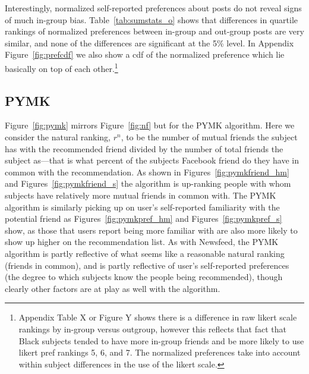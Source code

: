 \documentclass[12pt,letterpaper]{article}
\begin{document}
Interestingly, normalized self-reported preferences about posts do not reveal signs of much in-group bias. Table~\ref{tab:sumstats_o} shows that differences in quartile rankings of normalized preferences between in-group and out-group posts are very similar, and none of the differences are significant at the 5\% level. In Appendix Figure~\ref{fig:prefcdf} we also show a cdf of the normalized preference which lie basically on top of each other.\footnote{Appendix Table X or Figure Y shows there is a difference in raw likert scale rankings by in-group versus outgroup, however this reflects that fact that Black subjects tended to have more in-group friends and be more likely to use likert pref rankings 5, 6, and 7. The normalized preferences take into account within subject differences in the use of the likert scale.} 

\subsection{PYMK}

Figure~\ref{fig:pymk} mirrors Figure~\ref{fig:nf} but for the PYMK algorithm. Here we consider the natural ranking, $r^n$, to be the number of mutual friends the subject has with the recommended friend divided by the number of total friends the subject as---that is what percent of the subjects Facebook friend do they have in common with the recommendation.  As shown in Figures~\ref{fig:pymkfriend_hm} and Figures~\ref{fig:pymkfriend_s} the algorithm is up-ranking people with whom subjects have relatively more mutual friends in common with. The PYMK algorithm is similarly picking up on user's self-reported familiarity with the potential friend as Figures~\ref{fig:pymkpref_hm} and Figures~\ref{fig:pymkpref_s} show, as those that users report being more familiar with are also more likely to show up higher on the recommendation list. As with Newsfeed, the PYMK algorithm is partly reflective of what seems like a reasonable natural ranking (friends in common), and is partly reflective of user's self-reported preferences (the degree to which subjects know the people being recommended), though clearly other factors are at play as well with the algorithm.
\end{document}
